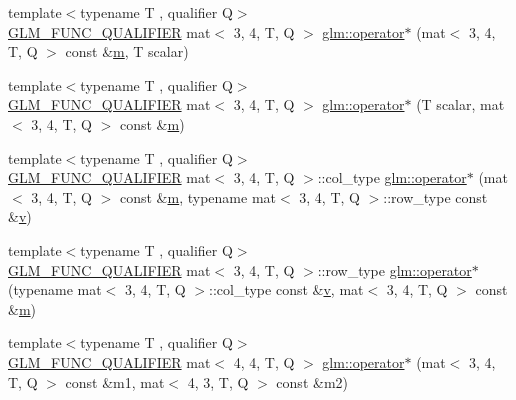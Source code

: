 \begin{DoxyCompactItemize}
\item 
{\footnotesize template$<$typename T , qualifier Q$>$ }\\\hyperlink{setup_8hpp_a33fdea6f91c5f834105f7415e2a64407}{G\+L\+M\+\_\+\+F\+U\+N\+C\+\_\+\+Q\+U\+A\+L\+I\+F\+I\+ER} mat$<$ 3, 4, T, Q $>$ \hyperlink{namespaceglm_a09af414dfec8e5eff15027c861c97c60}{glm\+::operator$\ast$} (mat$<$ 3, 4, T, Q $>$ const \&\hyperlink{_s_d_l__opengl__glext_8h_af593500c283bf1a787a6f947f503a5c2}{m}, T scalar)
\item 
{\footnotesize template$<$typename T , qualifier Q$>$ }\\\hyperlink{setup_8hpp_a33fdea6f91c5f834105f7415e2a64407}{G\+L\+M\+\_\+\+F\+U\+N\+C\+\_\+\+Q\+U\+A\+L\+I\+F\+I\+ER} mat$<$ 3, 4, T, Q $>$ \hyperlink{namespaceglm_ab4a2084b36d4588ff869ed7c747f3c0a}{glm\+::operator$\ast$} (T scalar, mat$<$ 3, 4, T, Q $>$ const \&\hyperlink{_s_d_l__opengl__glext_8h_af593500c283bf1a787a6f947f503a5c2}{m})
\item 
{\footnotesize template$<$typename T , qualifier Q$>$ }\\\hyperlink{setup_8hpp_a33fdea6f91c5f834105f7415e2a64407}{G\+L\+M\+\_\+\+F\+U\+N\+C\+\_\+\+Q\+U\+A\+L\+I\+F\+I\+ER} mat$<$ 3, 4, T, Q $>$\+::col\+\_\+type \hyperlink{namespaceglm_abd71409fec017293b28bad82e4352e4a}{glm\+::operator$\ast$} (mat$<$ 3, 4, T, Q $>$ const \&\hyperlink{_s_d_l__opengl__glext_8h_af593500c283bf1a787a6f947f503a5c2}{m}, typename mat$<$ 3, 4, T, Q $>$\+::row\+\_\+type const \&\hyperlink{_s_d_l__opengl_8h_a10a82eabcb59d2fcd74acee063775f90}{v})
\item 
{\footnotesize template$<$typename T , qualifier Q$>$ }\\\hyperlink{setup_8hpp_a33fdea6f91c5f834105f7415e2a64407}{G\+L\+M\+\_\+\+F\+U\+N\+C\+\_\+\+Q\+U\+A\+L\+I\+F\+I\+ER} mat$<$ 3, 4, T, Q $>$\+::row\+\_\+type \hyperlink{namespaceglm_a34ecb8c2c0525e10d9d1c0bbf8e2e1f3}{glm\+::operator$\ast$} (typename mat$<$ 3, 4, T, Q $>$\+::col\+\_\+type const \&\hyperlink{_s_d_l__opengl_8h_a10a82eabcb59d2fcd74acee063775f90}{v}, mat$<$ 3, 4, T, Q $>$ const \&\hyperlink{_s_d_l__opengl__glext_8h_af593500c283bf1a787a6f947f503a5c2}{m})
\item 
{\footnotesize template$<$typename T , qualifier Q$>$ }\\\hyperlink{setup_8hpp_a33fdea6f91c5f834105f7415e2a64407}{G\+L\+M\+\_\+\+F\+U\+N\+C\+\_\+\+Q\+U\+A\+L\+I\+F\+I\+ER} mat$<$ 4, 4, T, Q $>$ \hyperlink{namespaceglm_a8cf5a419af6088f7e2ef9f05509e0acb}{glm\+::operator$\ast$} (mat$<$ 3, 4, T, Q $>$ const \&m1, mat$<$ 4, 3, T, Q $>$ const \&m2)

\end{DoxyCompactItemize}
